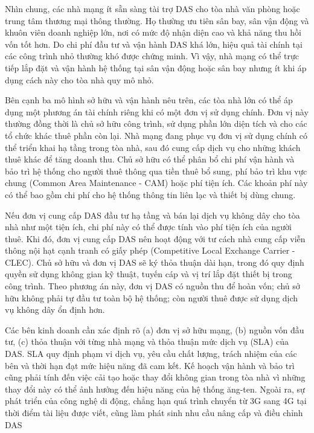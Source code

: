 \documentclass{thesis}
\begin{document}
Nhìn chung, các nhà mạng ít sẵn sàng tài trợ DAS cho tòa nhà văn
phòng hoặc trung tâm thương mại thông thường. Họ thường ưu tiên sân
bay, sân vận động và khuôn viên doanh nghiệp lớn, nơi có mức độ nhận
diện cao và khả năng thu hồi vốn tốt hơn. Do chi phí đầu tư và vận
hành DAS khá lớn, hiệu quả tài chính tại các công trình nhỏ thường
khó được chứng minh. Vì vậy, nhà mạng có thể trực tiếp lắp đặt và vận
hành hệ thống tại sân vận động hoặc sân bay nhưng ít khi áp dụng cách
này cho tòa nhà quy mô nhỏ.

Bên cạnh ba mô hình sở hữu và vận hành nêu trên, các tòa nhà lớn có
thể áp dụng một phương án tài chính riêng khi có một đơn vị sử dụng
chính. Đơn vị này thường đồng thời là chủ sở hữu công trình, sử dụng
phần lớn diện tích và cho các tổ chức khác thuê phần còn lại. Nhà
mạng đang phục vụ đơn vị sử dụng chính có thể triển khai hạ tầng
trong tòa nhà, sau đó cung cấp dịch vụ cho những khách thuê khác để
tăng doanh thu. Chủ sở hữu có thể phân bổ chi phí vận hành và bảo trì
hệ thống cho người thuê thông qua tiền thuê bổ sung, phí bảo trì khu
vực chung (Common Area Maintenance - CAM) hoặc phí tiện ích. Các
khoản phí này có thể bao gồm
chi phí cho hệ thống thông tin liên lạc và thiết bị dùng chung.

Nếu đơn vị cung cấp DAS đầu tư hạ tầng và bán lại dịch vụ không dây
cho tòa nhà như một tiện ích, chi phí này có thể được tính vào phí
tiện ích của người thuê. Khi đó, đơn vị cung cấp DAS nên hoạt động
với tư cách nhà cung cấp viễn thông nội hạt cạnh tranh có giấy phép
(Competitive Local Exchange Carrier - CLEC). Chủ sở hữu và đơn vị DAS
sẽ ký thỏa thuận dài hạn, trong đó
quy định quyền sử dụng không gian kỹ thuật, tuyến cáp và vị trí lắp
đặt thiết bị trong công trình. Theo phương án này, đơn vị DAS có
nguồn thu để hoàn vốn; chủ sở hữu không phải tự đầu tư toàn bộ hệ
thống; còn người thuê được sử dụng dịch vụ không dây ổn định hơn.


Các bên kinh doanh cần xác định rõ (a) đơn vị sở hữu mạng, (b) nguồn
vốn đầu tư, (c) thỏa thuận với từng nhà mạng và thỏa thuận mức dịch
vụ (SLA) của DAS. SLA quy định phạm vi dịch vụ, yêu cầu chất lượng,
trách nhiệm của các bên và thời hạn đạt mức hiệu năng đã cam kết. Kế
hoạch vận hành và bảo trì cũng phải tính đến việc cải tạo hoặc thay
đổi không gian trong tòa nhà vì những thay đổi này có thể ảnh hưởng
đến hiệu năng của hệ thống ăng-ten. Ngoài ra, sự phát triển của công
nghệ di động, chẳng hạn quá trình chuyển từ 3G sang 4G tại thời điểm
tài liệu được viết, cũng làm phát sinh nhu cầu nâng cấp và điều chỉnh DAS
\end{document}
